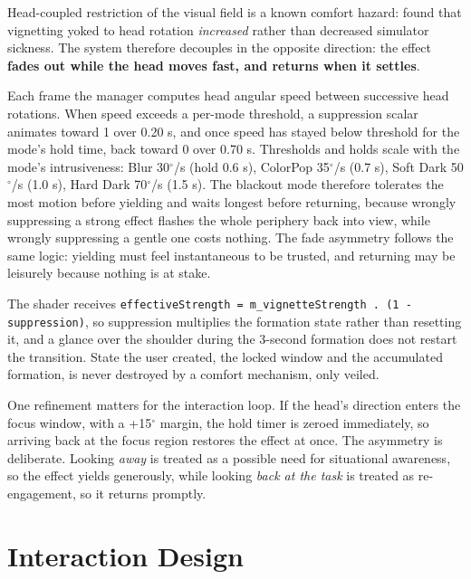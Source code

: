Head-coupled restriction of the visual field is a known comfort hazard: \citet{norouzi2018} found
that vignetting yoked to head rotation \textit{increased} rather than decreased simulator sickness. The
system therefore decouples in the opposite direction: the effect \textbf{fades out while the head moves
fast, and returns when it settles}.

Each frame the manager computes head angular speed between successive head rotations. When speed
exceeds a per-mode threshold, a suppression scalar animates toward 1 over 0.20 s, and once speed has
stayed below threshold for the mode's hold time, back toward 0 over 0.70 s. Thresholds and holds
scale with the mode's intrusiveness: Blur 30$^{\circ}$/s (hold 0.6 s), ColorPop 35$^{\circ}$/s (0.7 s),
Soft Dark 50$^{\circ}$/s (1.0 s), Hard Dark 70$^{\circ}$/s (1.5 s). The blackout mode therefore tolerates
the most motion before yielding and waits longest before returning, because wrongly suppressing a
strong effect flashes the whole periphery back into view, while wrongly suppressing a gentle one
costs nothing. The fade asymmetry follows the same logic: yielding must feel instantaneous to be
trusted, and returning may be leisurely because nothing is at stake.

The shader receives \verb|effectiveStrength = m_vignetteStrength . (1 - suppression)|, so suppression
multiplies the formation state rather than resetting it, and a glance over the shoulder during the
3-second formation does not restart the transition. State the user created, the locked window and the
accumulated formation, is never destroyed by a comfort mechanism, only veiled.

One refinement matters for the interaction loop. If the head's direction enters the focus window,
with a +15$^{\circ}$ margin, the hold timer is zeroed immediately, so arriving back at the focus region
restores the effect at once. The asymmetry is deliberate. Looking \textit{away} is treated as a possible
need for situational awareness, so the effect yields generously, while looking \textit{back at the task}
is treated as re-engagement, so it returns promptly.


\section{Interaction Design}

